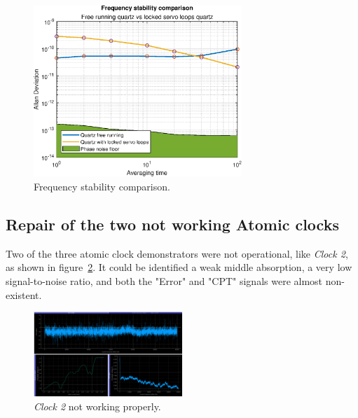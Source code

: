 \documentclass[a4paper,12pt]{article}
\begin{document}
\begin{figure}[!h]
    \centering
    \includegraphics[width=0.7\textwidth]{Images/allan_deviation.eps}
    \captionsetup{justification=centering}
    \caption{Frequency stability comparison.} 
    \label{fig:stability_comp}
\end{figure}


\subsection{Repair of the two not working Atomic clocks}
\label{section:repair_atomic_clocks}

Two of the three atomic clock demonstrators were not operational, like \textit{Clock 2}, as shown in \mbox{figure \ref{fig:not_working_1}}. It could be identified a weak middle absorption, a very low signal-to-noise ratio, and both the "Error" and "CPT" signals were almost non-existent.

\begin{figure}[!h]
    \centering
    \includegraphics[width=0.5\textwidth]{Images/not_working.png}
    \captionsetup{justification=centering}
    \caption{\textit{Clock 2} not working properly.} 
    \label{fig:not_working_1}
\end{figure}
\end{document}
